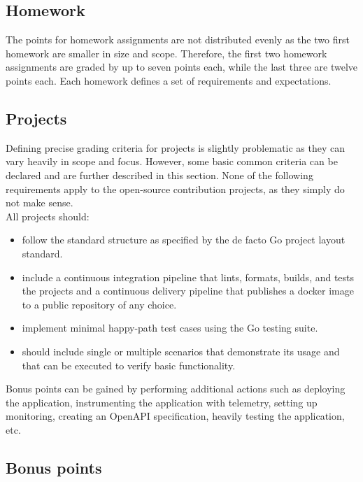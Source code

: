 \documentclass[
  digital,
  color,
  oneside,
  nosansbold,
  nocolorbold,
  nolof,
  nolot,
]{fithesis4}
\begin{document}
\subsection{Homework}

The points for homework assignments are not distributed evenly as the two first homework are smaller in size and scope. Therefore, the first two homework assignments are graded by up to seven points each, while the last three are twelve points each. Each homework defines a set of requirements and expectations.

\subsection{Projects}

Defining precise grading criteria for projects is slightly problematic as they can vary heavily in scope and focus. However, some basic common criteria can be declared and are further described in this section. None of the following requirements apply to the open-source contribution projects, as they simply do not make sense. \\

\noindent
All projects should:
\begin{itemize}
    \item follow the standard structure as specified by the de facto Go project layout standard\cite{go-project-layout}.
    \item include a continuous integration pipeline that lints, formats, builds, and tests the projects and a continuous delivery pipeline that publishes a docker image to a public repository of any choice.
    \item implement minimal happy-path test cases using the Go testing suite.
    \item should include single or multiple scenarios that demonstrate its usage and that can be executed to verify basic functionality.
\end{itemize}

\noindent
Bonus points can be gained by performing additional actions such as deploying the application, instrumenting the application with telemetry, setting up monitoring, creating an OpenAPI specification, heavily testing the application, etc.

\subsection{Bonus points}
\end{document}
